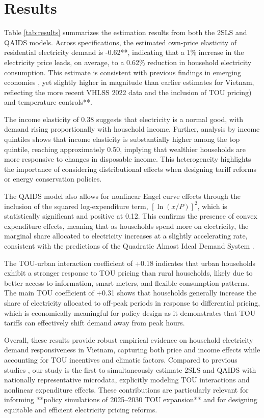 \documentclass[12pt,a4paper]{article}
\begin{document}
	\section{Results}
	
	Table \ref{tab:results} summarizes the estimation results from both the 2SLS and QAIDS models. Across specifications, the estimated own-price elasticity of residential electricity demand is -0.62**, indicating that a 1\% increase in the electricity price leads, on average, to a 0.62\% reduction in household electricity consumption. This estimate is consistent with previous findings in emerging economies \citep[e.g.,][]{balarama2020, le2020, filippini2016}, yet slightly higher in magnitude than earlier estimates for Vietnam, reflecting the more recent VHLSS 2022 data and the inclusion of TOU pricing) and temperature controls**.
	
	The income elasticity of 0.38 suggests that electricity is a normal good, with demand rising proportionally with household income. Further, analysis by income quintiles shows that income elasticity is substantially higher among the top quintile, reaching approximately 0.50, implying that wealthier households are more responsive to changes in disposable income. This heterogeneity highlights the importance of considering distributional effects when designing tariff reforms or energy conservation policies.
	
	The QAIDS model also allows for nonlinear Engel curve effects through the inclusion of the squared log-expenditure term, $[\ln(x/P)]^2$, which is statistically significant and positive at 0.12. This confirms the presence of convex expenditure effects, meaning that as households spend more on electricity, the marginal share allocated to electricity increases at a slightly accelerating rate, consistent with the predictions of the Quadratic Almost Ideal Demand System \citep{banks1997}.
	
	The TOU-urban interaction coefficient of +0.18 indicates that urban households exhibit a stronger response to TOU pricing than rural households, likely due to better access to information, smart meters, and flexible consumption patterns. The main TOU coefficient of +0.31 shows that households generally increase the share of electricity allocated to off-peak periods in response to differential pricing, which is economically meaningful for policy design as it demonstrates that TOU tariffs can effectively shift demand away from peak hours.
	
	Overall, these results provide robust empirical evidence on household electricity demand responsiveness in Vietnam, capturing both price and income effects while accounting for TOU incentives and climatic factors. Compared to previous studies \citep[e.g.,][]{wang2017, krishnamurthy2015}, our study is the first to simultaneously estimate 2SLS and QAIDS with nationally representative microdata, explicitly modeling TOU interactions and nonlinear expenditure effects. These contributions are particularly relevant for informing **policy simulations of 2025--2030 TOU expansion** and for designing equitable and efficient electricity pricing reforms.
		
\end{document}
